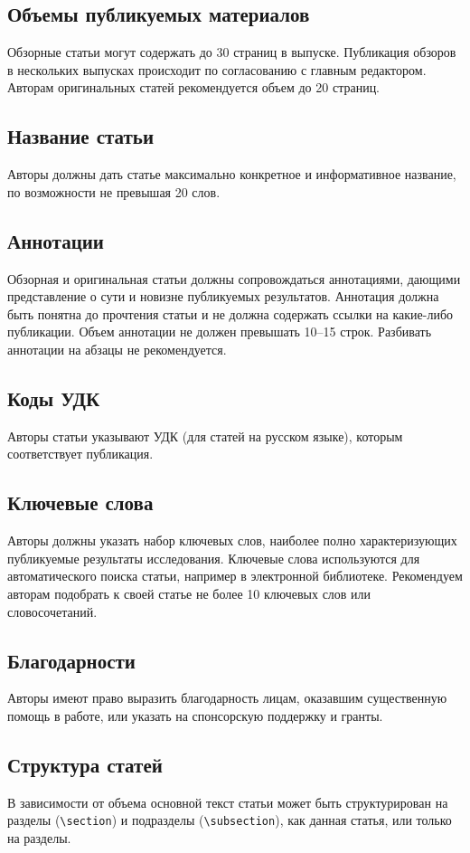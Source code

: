 \documentclass[10pt,a4paper]{book}
\begin{document}
\subsection{Объемы публикуемых материалов}
Обзорные статьи могут содержать до 30 страниц в выпуске. Публикация обзоров в нескольких
выпусках происходит по согласованию с главным редактором. Авторам оригинальных статей
рекомендуется объем до 20 страниц.

\subsection{Название статьи}
Авторы должны дать статье максимально конкретное и информативное название, по возможности
не превышая 20 слов.

\subsection{Аннотации}
Обзорная и оригинальная статьи должны сопровождаться аннотациями, дающими представление о
сути и новизне публикуемых результатов. Аннотация должна быть понятна до прочтения статьи
и не должна содержать ссылки на какие-либо публикации. Объем аннотации не должен превышать
10--15 строк. Разбивать аннотации на абзацы не рекомендуется.

\subsection{Коды УДК}
Авторы статьи указывают УДК (для статей на русском языке), которым соответствует публикация.

\subsection{Ключевые слова}
Авторы должны указать набор ключевых слов, наиболее полно характеризующих
публикуемые результаты исследования. Ключевые слова используются для автоматического
поиска статьи, например в электронной библиотеке. Рекомендуем авторам подобрать к своей 
статье не более 10 ключевых слов или словосочетаний.

\subsection{Благодарности}
Авторы имеют право выразить благодарность лицам, оказавшим существенную помощь 
в работе, или указать на спонсорскую поддержку и гранты.

\subsection{Структура статей}
В зависимости от объема основной текст статьи может быть структурирован 
на разделы (\verb!\section!) и подразделы (\verb!\subsection!), как данная 
статья, или только на разделы.
\end{document}
